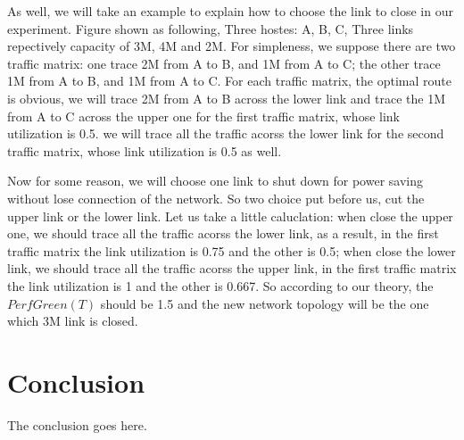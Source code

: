 \documentclass[conference]{IEEEtran}
\begin{document}
As well, we will take an example to explain how to choose the link to close in our experiment. Figure shown as following, Three 
hostes: A, B, C, Three links repectively capacity of 3M, 4M and 2M. For simpleness, we suppose there are two traffic matrix: one 
trace 2M from A to B, and 1M from A to C; the other trace 1M from A to B, and 1M from A to C. For each traffic matrix, the 
optimal route is obvious, we will trace 2M from A to B across the lower link and trace the 1M from A to C across the upper one 
for the first traffic matrix, whose link utilization is 0.5. we will trace all the traffic acorss the lower link for the second 
traffic matrix, whose link utilization is 0.5 as well.

Now for some reason, we will choose one link to shut down for power saving without lose connection of the network. So two choice 
put before us, cut the upper link or the lower link. Let us take a little caluclation: when close the upper one, we should 
trace all the traffic acorss the lower link, as a result, in the first traffic matrix the link utilization is 0.75 and the other
is 0.5; when close the lower link, we should trace all the traffic acorss the upper link, in the first traffic matrix the link 
utilization is 1 and the other is 0.667. So according to our theory, the $PerfGreen(T)$ should be 1.5 and the new network 
topology will be the one which 3M link is closed.



\section{Conclusion}
The conclusion goes here.


\end{document}
